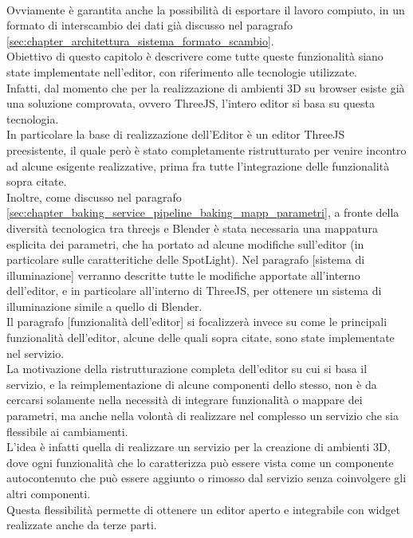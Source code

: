 \\ 
Ovviamente è garantita anche la possibilità di esportare il lavoro compiuto, in un formato di interscambio dei dati già discusso nel paragrafo \ref{sec:chapter_architettura_sistema_formato_scambio}.
\\
Obiettivo di questo capitolo è descrivere come tutte queste funzionalità siano state implementate nell’editor, con riferimento alle tecnologie utilizzate.
\\ 
Infatti, dal momento che per la realizzazione di ambienti 3D su browser esiste già una soluzione comprovata, ovvero ThreeJS, l’intero editor si basa su questa tecnologia.
\\
In particolare la base di realizzazione dell’Editor è un editor ThreeJS preesistente, il quale però è stato completamente ristrutturato per venire incontro ad alcune esigente realizzative, prima fra tutte l’integrazione delle funzionalità sopra citate.
\\  
Inoltre, come discusso nel paragrafo \ref{sec:chapter_baking_service_pipeline_baking_mapp_parametri}, a fronte della diversità tecnologica tra threejs e Blender è stata necessaria una mappatura esplicita dei parametri, che ha portato ad alcune modifiche sull’editor (in particolare sulle caratteritiche delle SpotLight). Nel paragrafo [sistema di illuminazione] verranno descritte tutte le modifiche apportate all’interno dell’editor, e in particolare all’interno di ThreeJS, per ottenere un sistema di illuminazione simile a quello di Blender.
\\  
Il paragrafo [funzionalità dell’editor] si focalizzerà invece su come le principali funzionalità dell’editor, alcune delle quali sopra citate, sono state implementate nel servizio.
\\
La motivazione della ristrutturazione completa dell’editor su cui si basa il servizio, e la reimplementazione di alcune componenti dello stesso, non è da cercarsi solamente nella necessità di integrare funzionalità o mappare dei parametri, ma anche nella volontà di realizzare nel complesso un servizio che sia flessibile ai cambiamenti.
\\ 
L’idea è infatti quella di realizzare un servizio per la creazione di ambienti 3D, dove ogni funzionalità che lo caratterizza può essere vista come un componente autocontenuto che può essere aggiunto o rimosso dal servizio senza coinvolgere gli altri componenti.
\\
Questa flessibilità permette di ottenere un editor aperto e integrabile con widget realizzate anche da terze parti.
